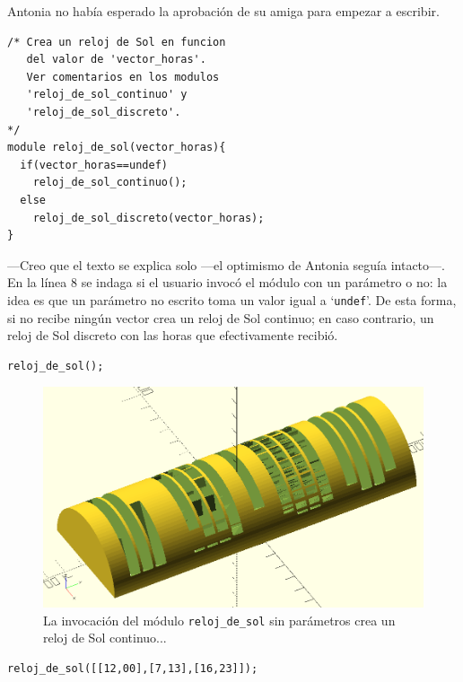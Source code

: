 Antonia no había esperado la aprobación de su amiga para empezar a
escribir.

\begin{lstlisting}
/* Crea un reloj de Sol en funcion
   del valor de 'vector_horas'.
   Ver comentarios en los modulos
   'reloj_de_sol_continuo' y
   'reloj_de_sol_discreto'.
*/
module reloj_de_sol(vector_horas){
  if(vector_horas==undef)
    reloj_de_sol_continuo();
  else
    reloj_de_sol_discreto(vector_horas);
}
\end{lstlisting}

---Creo que el texto se explica solo ---el optimismo de Antonia seguía
intacto---. En la línea 8 se indaga si el usuario invocó el módulo con
un parámetro o no: la idea es que un parámetro no escrito toma un
valor igual a `\lstinline!undef!'. De esta forma, si no recibe ningún
vector crea un reloj de Sol continuo; en caso contrario, un reloj de
Sol discreto con las horas que efectivamente recibió.

\begin{lstlisting}[numbers=none]
reloj_de_sol();
\end{lstlisting}%


\begin{figure}[ht]
  \centering
  \includegraphics[width=.83\textwidth]{imagenes/reloj-de-sol-continuo-2}  
  \caption{La invocación del módulo \lstinline!reloj_de_sol! sin
    parámetros crea un reloj de Sol continuo...}
  \label{fig:reloj-de-sol-continuo-2}
\end{figure}


\begin{lstlisting}[numbers=none]
reloj_de_sol([[12,00],[7,13],[16,23]]);
\end{lstlisting}%



